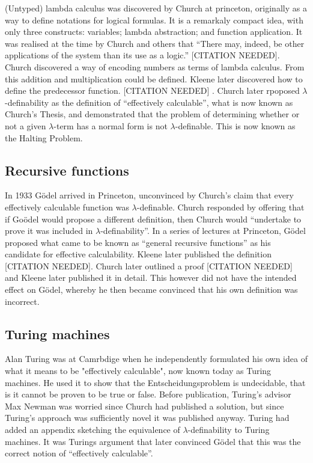 (Untyped) lambda calculus was discovered by Church at princeton, originally as a way to define notations for logical formulas. It is a remarkaly compact idea, with only three constructs: variables; lambda abstraction; and function application. It was realised at the time by Church and others that ``There may, indeed, be other applications of the system than its use as a logic.'' [CITATION NEEDED]\cite{}. Church discovered a way of encoding numbers as terms of lambda calculus. From this addition and multiplication could be defined. Kleene later discovered how to define the predecessor function. [CITATION NEEDED] \cite{}. Church later rpoposed $\lambda$-definability as the definition of ``effectively calculable'', what is now known as Church's Thesis, and demonstrated that the problem of determining whether or not a given $\lambda$-term  has a normal form is not $\lambda$-definable. This is now known as the Halting Problem. 

\subsection{Recursive functions}

In 1933 G\"odel arrived in Princeton, unconvinced by Church's claim that every effectively calculable function was $\lambda$-definable. Church responded by offering that if Go\"odel would propose a different definition, then Church would ``undertake to prove it was included in $\lambda$-definability''. In a series of lectures at Princeton, G\"odel proposed what came to be known as ``general recursive functions'' as his candidate for effective calculability. Kleene later published the definition [CITATION NEEDED]\cite{}. Church later outlined a proof [CITATION NEEDED]\cite{} and Kleene later published it in detail. This however did not have the intended effect on G\"odel, whereby he then became convinced that his own definition was incorrect.

\subsection{Turing machines}

Alan Turing was at Camrbdige when he independently formulated his own idea of what it means to be "effectively calculable", now known today as Turing machines. He used it to show that the Entscheidungsproblem is undecidable, that is it cannot be proven to be true or false. Before publication, Turing's advisor Max Newman was worried since Church had published a solution, but since Turing's approach was sufficiently novel it was published anyway. Turing had added an appendix sketching the equivalence of $\lambda$-definability to Turing machines. It was Turings argument that later convinced G\"odel that this was the correct notion of ``effectively calculable''.

